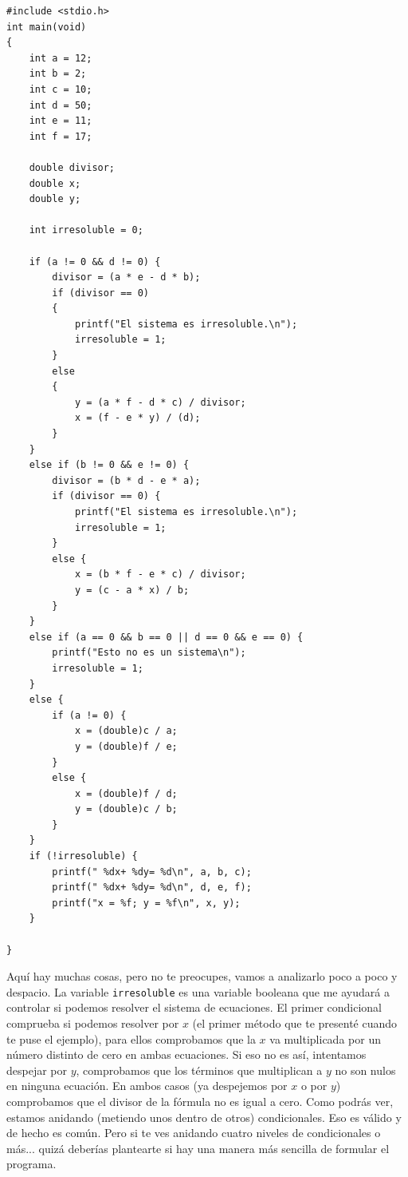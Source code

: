 \documentclass[a4paper]{article}
\begin{document}
\begin{lstlisting}[style=C,
caption={Programa de resolución de ecuaciones lineales con condicionales},
label={lst:linealSystemFinal}]
#include <stdio.h>
int main(void)
{
    int a = 12;
    int b = 2;
    int c = 10;
    int d = 50;
    int e = 11;
    int f = 17;

    double divisor;
    double x;
    double y;

    int irresoluble = 0;

    if (a != 0 && d != 0) {
        divisor = (a * e - d * b);
        if (divisor == 0)
        {
            printf("El sistema es irresoluble.\n");
            irresoluble = 1;
        }
        else
        {
            y = (a * f - d * c) / divisor;
            x = (f - e * y) / (d);
        }
    }
    else if (b != 0 && e != 0) {
        divisor = (b * d - e * a);
        if (divisor == 0) {
            printf("El sistema es irresoluble.\n");
            irresoluble = 1;
        }
        else {
            x = (b * f - e * c) / divisor;
            y = (c - a * x) / b;
        }
    }
    else if (a == 0 && b == 0 || d == 0 && e == 0) {
        printf("Esto no es un sistema\n");
        irresoluble = 1;
    }
    else {
        if (a != 0) {
            x = (double)c / a;
            y = (double)f / e;
        }
        else {
            x = (double)f / d;
            y = (double)c / b;
        }
    }
    if (!irresoluble) {
        printf(" %dx+ %dy= %d\n", a, b, c);
        printf(" %dx+ %dy= %d\n", d, e, f);
        printf("x = %f; y = %f\n", x, y);
    }

}
\end{lstlisting}


Aquí hay muchas cosas, pero no te preocupes, vamos a analizarlo poco a poco y despacio.
La variable \verb!irresoluble!  es una variable booleana que me ayudará a
controlar si podemos resolver el sistema de ecuaciones. El primer condicional
comprueba si podemos resolver por $x$ (el primer método que te presenté cuando
te puse el ejemplo), para ellos comprobamos que la $x$ va multiplicada por un
número distinto de cero en ambas ecuaciones. Si eso no es así, intentamos
despejar por $y$, comprobamos que los términos que multiplican a $y$ no son
nulos en ninguna ecuación. En ambos casos (ya despejemos por $x$ o por $y$)
comprobamos que el divisor de la fórmula no es igual a cero.
Como podrás ver, estamos anidando (metiendo unos dentro de otros)
condicionales. Eso es válido y de hecho
es común. Pero si te ves anidando cuatro niveles de condicionales o más... quizá
deberías plantearte si hay una manera más sencilla de formular el programa.
\end{document}
